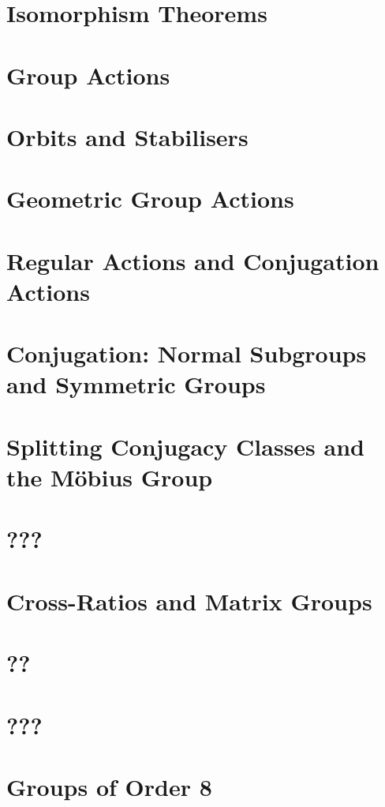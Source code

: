 \documentclass{article}
\begin{document}
\section{Isomorphism Theorems}

\section{Group Actions}

\section{Orbits and Stabilisers}

\section{Geometric Group Actions}

\section{Regular Actions and Conjugation Actions}

\section{Conjugation: Normal Subgroups and Symmetric Groups}

\section{Splitting Conjugacy Classes and the M\"obius Group}

\section{???}

\section{Cross-Ratios and Matrix Groups}

\section{??}

\section{???}

\section{Groups of Order 8}

\end{document}

